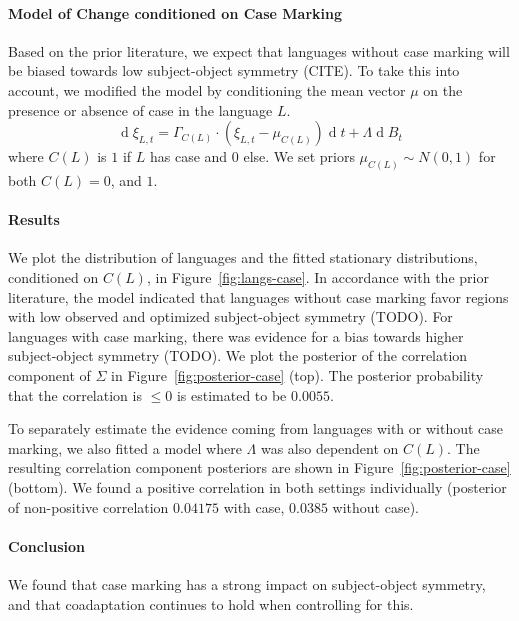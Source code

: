 \documentclass[11pt,a4paper]{article}
\begin{document}
\paragraph{Model of Change conditioned on Case Marking}
Based on the prior literature, we expect that languages without case marking will be biased towards low subject-object symmetry (CITE).
To take this into account, we modified the model by conditioning the mean vector $\mu$ on the presence or absence of case in the language $L$.
\begin{equation*}
    \operatorname{d}\xi_{L,t} = \Gamma_{C(L)} \cdot (\xi_{L,t}-\mu_{C(L)}) \operatorname{d}t + \Lambda \operatorname{d}B_t
\end{equation*}
where $C(L)$ is $1$ if $L$ has case and $0$ else.
We set priors $\mu_{C(L)} \sim N(0,1)$ for both $C(L) = 0$, and $1$.


\paragraph{Results}
We plot the distribution of languages and the fitted stationary distributions, conditioned on $C(L)$, in Figure~\ref{fig:langs-case}.
In accordance with the prior literature, the model indicated that languages without case marking favor regions with low observed and optimized subject-object symmetry (TODO).
For languages with case marking, there was evidence for a bias towards higher subject-object symmetry (TODO).
We plot the posterior of the correlation component of $\Sigma$ in Figure~\ref{fig:posterior-case} (top).
The posterior probability that the correlation is $\leq 0$ is estimated to be $0.0055$.

To separately estimate the evidence coming from languages with or without case marking, we also fitted a model where $\Lambda$ was also dependent on $C(L)$.
The resulting correlation component posteriors are shown in Figure~\ref{fig:posterior-case} (bottom).
We found a positive correlation in both settings individually (posterior of non-positive correlation $0.04175$ with case, $0.0385$ without case).

\paragraph{Conclusion}
We found that case marking has a strong impact on subject-object symmetry, and that coadaptation continues to hold when controlling for this.
\end{document}
